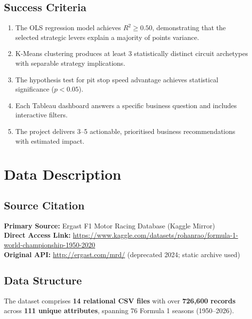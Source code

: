 \documentclass[12pt, a4paper]{article}
\begin{document}
\subsection{Success Criteria}
\begin{enumerate}[noitemsep]
    \item The OLS regression model achieves $R^2 \geq 0.50$, demonstrating that the selected strategic levers explain a majority of points variance.
    \item K-Means clustering produces at least 3 statistically distinct circuit archetypes with separable strategy implications.
    \item The hypothesis test for pit stop speed advantage achieves statistical significance ($p < 0.05$).
    \item Each Tableau dashboard answers a specific business question and includes interactive filters.
    \item The project delivers 3--5 actionable, prioritised business recommendations with estimated impact.
\end{enumerate}

\newpage

\section{Data Description}

\subsection{Source Citation}
\textbf{Primary Source:} Ergast F1 Motor Racing Database (Kaggle Mirror)\\
\textbf{Direct Access Link:} \url{https://www.kaggle.com/datasets/rohanrao/formula-1-world-championship-1950-2020}\\
\textbf{Original API:} \url{http://ergast.com/mrd/} (deprecated 2024; static archive used)

\subsection{Data Structure}
The dataset comprises \textbf{14 relational CSV files} with over \textbf{726,600 records} across \textbf{111 unique attributes}, spanning 76 Formula 1 seasons (1950--2026).
\end{document}
